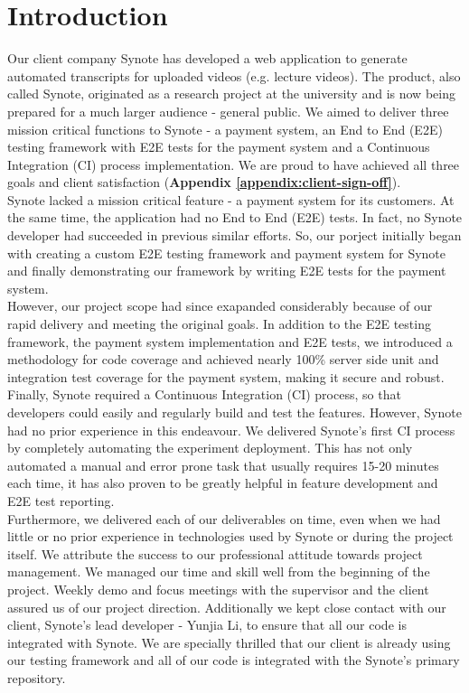 \chapter{Introduction}
\label{chap:introduction}

Our client company Synote has developed a web application to generate automated transcripts for uploaded videos (e.g. lecture videos). The product, also called Synote, originated as a research project at the university and is now being prepared for a much larger audience - general public. We aimed to deliver three mission critical functions to Synote - a payment system, an End to End (E2E) testing framework with E2E tests for the payment system and a Continuous Integration (CI) process implementation. We are proud to have achieved all three goals and client satisfaction (\textbf{Appendix \ref{appendix:client-sign-off}}).\\

Synote lacked a mission critical feature - a payment system for its customers. At the same time, the application had no End to End (E2E) tests. In fact, no Synote developer had succeeded in previous similar efforts. So, our porject initially began with creating a custom E2E testing framework and payment system for Synote and finally demonstrating our framework by writing E2E tests for the payment system.\\

However, our project scope had since exapanded considerably because of our rapid delivery and meeting the original goals. In addition to the E2E testing framework, the payment system implementation and E2E tests, we introduced a methodology for code coverage and achieved nearly 100\% server side unit and integration test coverage for the payment system, making it secure and robust.\\

Finally, Synote required a Continuous Integration (CI) process, so that developers could easily and regularly build and test the features. However, Synote had no prior experience in this endeavour. We delivered Synote's first CI process by completely automating the experiment deployment. This has not only automated a manual and error prone task that usually requires 15-20 minutes each time, it has also proven to be greatly helpful in feature development and E2E test reporting.\\

Furthermore, we delivered each of our deliverables on time, even when we had little or no prior experience in technologies used by Synote or during the project itself. We attribute the success to our professional attitude towards project management. We managed our time and skill well from the beginning of the project. Weekly demo and focus meetings with the supervisor and the client assured us of our project direction. Additionally we kept close contact with our client, Synote's lead developer - Yunjia Li, to ensure that all our code is integrated with Synote. We are specially thrilled that our client is already using our testing framework and all of our code is integrated with the Synote's primary repository.\\

